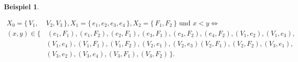 \documentclass[12pt,titlepage,twoside,cleardoublepage]{article}
\theoremstyle{nummermitklammern}
\newtheorem{bsp}[temp]{Beispiel}
\newtheorem{bsp}[zahl]{Beispiel}
\numberwithin{equation}{section}
\begin{document}
\begin{bsp}
\begin{enumerate}
\begin{align*}
  X_{0}=\{\,V_{1},&V_{2},V_{3}\,\},X_{1}=\{\,e_{1},e_{2},e_{3},e_{4} \,\}, X_{2}=\{\,F_{1},F_{2}\,\} \text{ und } x<y \Leftrightarrow\\
 (x,y)\in\{&\,(e_{1},F_{1}),(e_{1},F_{2}),(e_{2},F_{1}),(e_{3},F_{1}),(e_{3},F_{2}),(e_{4},F_{2}),(V_{1},e_{2}),(V_{1},e_{3}),\\ &(V_{1},e_{4}),
  (V_{1},F_{1}),(V_{1},F_{2}),(V_{2},e_{1}),(V_{2},e_{3})
 (V_{2},F_{1}), (V_{2},F_{2}), (V_{3},e_{1}),\\&(V_{3},e_{2}),(V_{3},e_{4}),(V_{3},F_{1}),(V_3,F_2) \,\}.
 \end{align*}
 \end{enumerate}
\begin{figure}[H]
\begin{tikzpicture}[line cap=round,line join=round,>=triangle 45,x=1.0cm,y=1.0cm]


\end{tikzpicture}
\end{figure}
\end{bsp}
\end{document}
